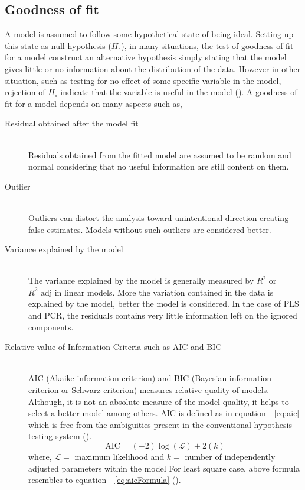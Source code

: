 \documentclass[12pt, lot, lof]{thesis}\usepackage[]{graphicx}\usepackage[]{color}
\begin{document}
\subsection{Goodness of fit}
\label{ssec:goodnessFit}
A model is assumed to follow some hypothetical state of being ideal. Setting up this state as null hypothesis ($H_\circ$), in many situations, the test of goodness of fit for a model construct an alternative hypothesis simply stating that the model gives little or no information about the distribution of the data. However in other situation, such as testing for no effect of some specific variable in the model, rejection of $H_\circ$ indicate that the variable is useful in the model (\cite[p.~1]{d1986goodness}). A goodness of fit for a model depends on many aspects such as,
\begin{description}
\item [Residual obtained after the model fit] \hfill\\
Residuals obtained from the fitted model are assumed to be random and normal considering that no useful information are still content on them.
\item[Outlier] \hfill\\
Outliers can distort the analysis toward unintentional direction creating false estimates. Models without such outliers are considered better.
\item [Variance explained by the model] \hfill\\
The variance explained by the model is generally measured by $R^2$ or $R^2 \text{ adj}$ in linear models. More the variation contained in the data is explained by the model, better the model is considered. In the case of PLS and PCR, the residuals contains very little information left on the ignored components.
\item [Relative value of Information Criteria such as AIC and BIC] \hfill\\
AIC (Akaike information criterion) and BIC (Bayesian information criterion or Schwarz criterion) measures relative quality of models. Although, it is not an absolute measure of the model quality, it helps to select a better model among others. AIC is defined as in equation - \ref{eq:aic} which is free from the ambiguities present in the conventional hypothesis testing system (\cite{akaike1974new}).
\begin{equation}
\label{eq:aic}
\text{AIC} = (-2)\log(\mathcal{L}) + 2(k)
\end{equation}
where, $\mathcal{L} =$ maximum likelihood and $k =$ number of independently adjusted parameters  within the model
For least square case, above formula resembles to equation - \ref{eq:aicFormula} (\cite{hu2007akaike}).
\end{description}
\end{document}
